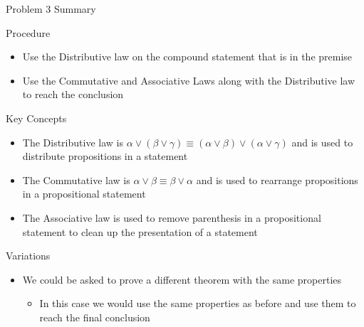 \begin{summary}{Problem 3 Summary}
    \begin{statement}{Procedure}
        \begin{itemize}
            \item Use the Distributive law on the compound statement that is in the premise
            \item Use the Commutative and Associative Laws along with the Distributive law to reach the conclusion
        \end{itemize}
    \end{statement}
    \begin{statement}{Key Concepts}
        \begin{itemize}
            \item The Distributive law is $\alpha \vee (\beta \vee \gamma) \equiv (\alpha \vee \beta) \vee (\alpha \vee \gamma)$ and is used to distribute propositions in a statement
            \item The Commutative law is $\alpha \vee \beta \equiv \beta \vee \alpha$ and is used to rearrange propositions in a propositional statement
            \item The Associative law is used to remove parenthesis in a propositional statement to clean up the presentation of a statement
        \end{itemize}
    \end{statement}
    \begin{statement}{Variations}
        \begin{itemize}
            \item We could be asked to prove a different theorem with the same properties
            \begin{itemize}
                \item In this case we would use the same properties as before and use them to reach the final conclusion
            \end{itemize}
        \end{itemize}
    \end{statement}
\end{summary}

